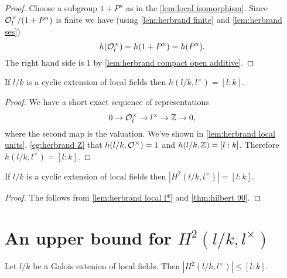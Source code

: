 \begin{proof}
	Choose a subgroup $1+P^n$ as in the \ref{lem:local isomorphism}.
	Since ${\mathcal O}_l^\times / (1+P^n)$ is finite we have
	(using \ref{lem:herbrand finite} and \ref{lem:herbrand ses})
	\[
		h({\mathcal O}_l^\times) = h(1+P^n) = h(P^n).
	\]
	The right hand side is $1$ by \ref{lem:herbrand compact open additive}.
\end{proof}

\begin{lemma} \label{lem:herbrand local l*}
	If $l/k$ is a cyclic extension of local fields then $h(l/k, l^\times)= [l:k]$.
\end{lemma}

\begin{proof}
	We have a short exact sequence of representations
	\[
		0 \to {\mathcal O}_l^\times \to l^\times \to {\mathbb Z} \to 0,
 	\]
	where the second map is the valuation.
	We've shown in \ref{lem:herbrand local units}, \ref{eg:herbrand Z}
	that $h(l/k,{\mathcal O}^\times)=1$ and $h(l/k,{\mathbb Z}) = [l:k]$.
	Therefore $h(l/k,l^\times) = [l:k]$.
\end{proof}


\begin{lemma} \label{lem:local H2 l*}
	If $l/k$ is a cyclic extension of local fields then $|H^2(l/k,l^\times)| = [l:k]$.
\end{lemma}

\begin{proof}
	The follows from \ref{lem:herbrand local l*} and \ref{thm:hilbert 90}.
\end{proof}




\section{An upper bound for \texorpdfstring{$H^2(l/k,l^\times)$}{$H^2(l/k,l*)$}}

\begin{theorem} \label{lem:local H2 upper bound}
	Let $l/k$ be a Galois extenion of local fields.
	Then $|H^2(l/k,l^\times)| \le [l:k]$.
\end{theorem}

